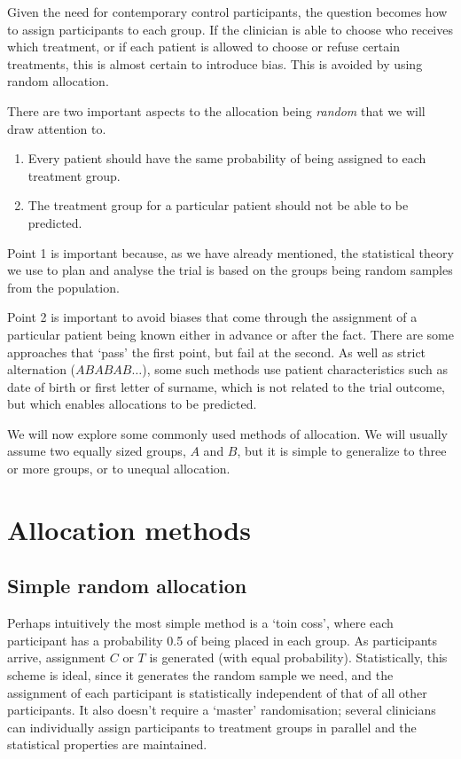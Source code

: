 \documentclass[
  openany]{book}
\providecommand{\tightlist}{%
  \setlength{\itemsep}{0pt}\setlength{\parskip}{0pt}}
\theoremstyle{definition}
\theoremstyle{definition}
\theoremstyle{definition}
\theoremstyle{definition}
\theoremstyle{remark}
\begin{document}
Given the need for contemporary control participants, the question becomes how to assign participants to each group. If the clinician is able to choose who receives which treatment, or if each patient is allowed to choose or refuse certain treatments, this is almost certain to introduce bias. This is avoided by using random allocation.

There are two important aspects to the allocation being \emph{random} that we will draw attention to.

\begin{enumerate}
\def\labelenumi{\arabic{enumi}.}
\tightlist
\item
  Every patient should have the same probability of being assigned to each treatment group.
\item
  The treatment group for a particular patient should not be able to be predicted.
\end{enumerate}

Point 1 is important because, as we have already mentioned, the statistical theory we use to plan and analyse the trial is based on the groups being random samples from the population.

Point 2 is important to avoid biases that come through the assignment of a particular patient being known either in advance or after the fact. There are some approaches that `pass' the first point, but fail at the second. As well as strict alternation (\(ABABAB\ldots\)), some such methods use patient characteristics such as date of birth or first letter of surname, which is not related to the trial outcome, but which enables allocations to be predicted.

We will now explore some commonly used methods of allocation. We will usually assume two equally sized groups, \(A\) and \(B\), but it is simple to generalize to three or more groups, or to unequal allocation.

\section{Allocation methods}\label{sec-allocation}

\subsection{Simple random allocation}\label{simple-random-allocation}

Perhaps intuitively the most simple method is a `toin coss', where each participant has a probability 0.5 of being placed in each group. As participants arrive, assignment \(C\) or \(T\) is generated (with equal probability). Statistically, this scheme is ideal, since it generates the random sample we need, and the assignment of each participant is statistically independent of that of all other participants. It also doesn't require a `master' randomisation; several clinicians can individually assign participants to treatment groups in parallel and the statistical properties are maintained.
\end{document}
